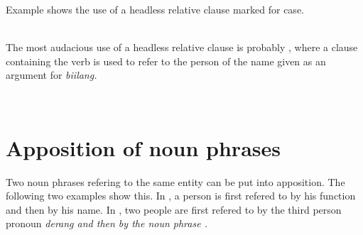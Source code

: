 Example  shows the use of a headless relative clause marked for case.

\\

The most audacious use of a headless relative clause is probably , where a clause containing the verb  is used to refer to  the person of the name given as an argument for \em biilang\em.

\\




\section{Apposition of noun phrases}\label{sec:nppp:Appositionofnounphrases}
Two noun phrases refering to the same entity can be put into apposition.  The following two examples show this. In , a person is first refered to by his function and then by his name. In , two people are first refered to by the third person pronoun \em derang \em and then by the noun phrase .

